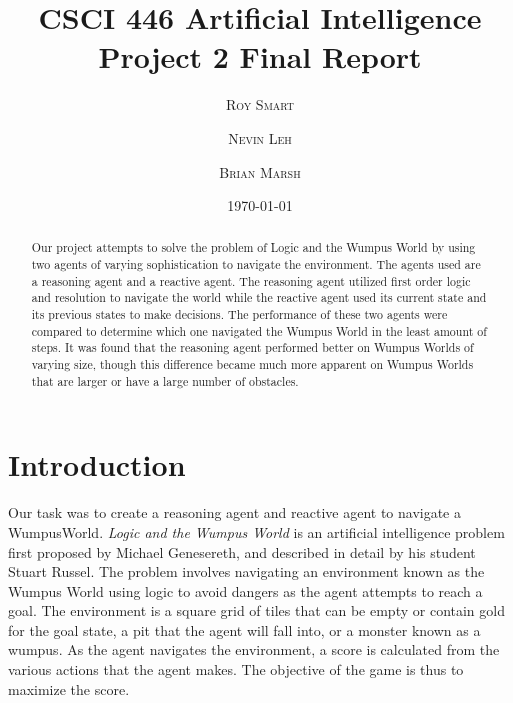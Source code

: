 \documentclass{article}
\title{\vspace{-15mm}\fontsize{24pt}{10pt}\selectfont\textbf{CSCI 446 Artificial Intelligence \\ Project 2 Final Report} \\[-2mm]} %
\date{\today}
\author{
\large
\textsc{Roy Smart} \and \textsc{Nevin Leh} \and \textsc{Brian Marsh}\\[2mm] %
}
\begin{document}
\maketitle %

\thispagestyle{fancy} %



\normalsize

\begin{abstract}
	Our project attempts to solve the problem of Logic and the Wumpus World by using two agents of varying sophistication to navigate the environment.
	 The agents used are a reasoning agent and a reactive agent. The reasoning agent utilized first order logic and resolution to navigate the world while the reactive agent used its current state and its previous states to make decisions. The performance of these two agents were compared to determine which one navigated the Wumpus World in the least amount of steps. It was found that the reasoning agent performed better on Wumpus Worlds of varying size, though this difference became much more apparent on Wumpus Worlds that are larger or have a large number of obstacles.
\end{abstract}
\section{Introduction}
Our task was to create a reasoning agent and reactive agent to navigate a WumpusWorld.
		\textit{Logic and the Wumpus World} is an artificial intelligence problem first proposed by Michael Genesereth, and described in detail by his student Stuart Russel\cite{ai}.  The problem involves navigating an environment known as the Wumpus World using logic to avoid dangers as the agent attempts to reach a goal.  The environment is a square grid of tiles that can be empty or contain gold for the goal state, a pit that the agent will fall into, or a monster known as a wumpus. 
		 As the agent navigates the environment, a score is calculated from the various actions that the agent makes.  
		 The objective of the game is thus to maximize the score.
		 
\end{document}
